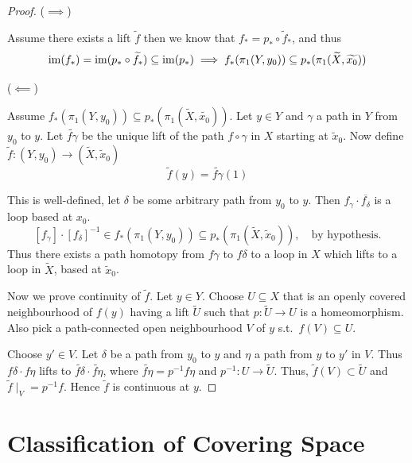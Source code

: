 \documentclass[12pt]{amsart}
\begin{document}
\begin{proof}
    ($\implies$)

    Assume there exists a lift $\widetilde{f}$ then we know that $f_* = p_* \circ \widetilde{f}_*$, and thus 
    \[\operatorname{im}(f_*) = \operatorname{im}(p_* \circ \widetilde{f}_*) \subseteq \operatorname{im}(p_*) \implies f_*(\pi_1(Y, y_0)) \subseteq p_*(\pi_1(\widetilde{X}, \widetilde{x_0}))\] 

    ($\impliedby$)

    Assume $f_*(\pi_1(Y, y_0)) \subseteq p_*(\pi_1(\widetilde{X}, \widetilde{x_0}))$. Let $y \in Y$ and $\gamma$ a path in $Y$ from $y_0$ to $y$. Let $\widetilde{f\gamma}$ be the unique lift of the path $f \circ \gamma$ in $X$ starting at $\widetilde{x}_0$. Now define $\widetilde{f}: (Y, y_0) \to (\widetilde{X}, \widetilde{x}_0)$
    \[
    \widetilde{f}(y) = \widetilde{f\gamma}(1)
    \]

    This is well-defined, let $\delta$ be some arbitrary path from $y_0$ to $y$. Then $f_\gamma \cdot \overline{f_\delta}$ is a loop based at $x_0$.
    \[
    [f_\gamma] \cdot [f_\delta]^{-1} \in f_*(\pi_1(Y, y_0)) \subseteq p_*(\pi_1(\widetilde{X}, \widetilde{x}_0)), \quad \text{by hypothesis.}
    \]
    Thus there exists a path homotopy from $f\gamma$ to $f\delta$ to a loop in $X$ which lifts to a loop in $\widetilde{X}$, based at $\widetilde{x}_0$. 

    Now we prove continuity of $\widetilde{f}$. Let $y \in Y$. Choose $U \subseteq X$ that is an openly covered neighbourhood of $f(y)$ having a lift $\widetilde{U}$ such that $p: \widetilde{U} \to U$ is a homeomorphism. Also pick a path-connected open neighbourhood $V$ of $y$ s.t.\ $f(V) \subseteq U$. 

    Choose $y' \in V$. Let $\delta$ be a path from $y_0$ to $y$ and $\eta$ a path from $y$ to $y'$ in $V$. Thus $f\delta \cdot f\eta$ lifts to $\widetilde{f\delta} \cdot \widetilde{f\eta}$, where $\widetilde{f \eta} = p^{-1} f \eta$ and $p^{-1}: U \to \widetilde{U}$. Thus, $\widetilde{f}(V) \subset \widetilde{U}$ and $\widetilde{f} \mid_V = p^{-1} f$. Hence $\widetilde{f}$ is continuous at $y$. 
\end{proof}

\newpage 

\section{Classification of Covering Space} 
\end{document}

